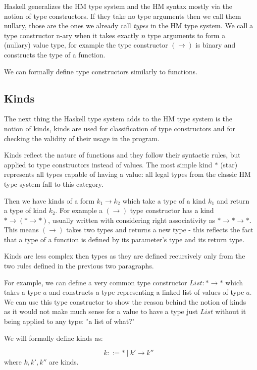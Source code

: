 Haskell generalizes the HM type system and the HM syntax mostly via the notion of type constructors. If they take no type arguments then we call them nullary, those are the ones we already call \emph{types} in the HM type system. We call a type constructor n-ary when it takes exactly $n$ type arguments to form a (nullary) value type, for example the type constructor $(\rightarrow)$ is binary and constructs the type of a function.

We can formally define type constructors similarly to functions.

\subsection{Kinds}

The next thing the Haskell type system adds to the HM type system is the notion of kinds, kinds are used for classification of type constructors and for checking the validity of their usage in the program.

Kinds reflect the nature of functions and they follow their syntactic rules, but applied to type constructors instead of values. The most simple kind $*$ (star) represents all types capable of having a value: all legal types from the classic HM type system fall to this category.

Then we have kinds of a form $k_1 \rightarrow k_2$ which take a type of a kind $k_1$ and return a type of kind $k_2$. For example a $(\rightarrow)$ type constructor has a kind $* \rightarrow (* \rightarrow *)$, usually written with considering right associativity as $* \rightarrow * \rightarrow *$. This means $(\rightarrow)$ takes two types and returns a new type - this reflects the fact that a type of a function is defined by its parameter's type and its return type.

Kinds are less complex then types as they are defined recursively only from the two rules defined in the previous two paragraphs.

For example, we can define a very common type constructor $List: * \rightarrow *$ which takes a type $a$ and constructs a type representing a linked list of values of type $a$. We can use this type constructor to show the reason behind the notion of kinds as it would not make much sense for a value to have a type just $List$ without it being applied to any type: "a list of what?"

We will formally define kinds as:

\begin{defn}[kinds]
    $$k ::= *\ |\ k' \rightarrow k''$$
    where $k, k', k''$ are kinds.
\end{defn}

